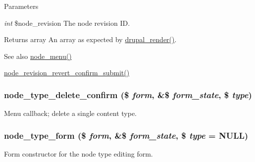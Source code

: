 \begin{DoxyParams}{Parameters}
\item[{\em int}]\$node\_\-revision The node revision ID.\end{DoxyParams}
\begin{DoxyReturn}{Returns}
array An array as expected by \hyperlink{common_8inc_a05798b44e8d6c496d4bee5cc32fa7851}{drupal\_\-render()}.
\end{DoxyReturn}
\begin{DoxySeeAlso}{See also}
\hyperlink{node_8module_a15e8d85a7559f22b8f2c77c1d5dfac63}{node\_\-menu()} 

\hyperlink{node_8pages_8inc_ae22f280976210711cb3bd363caa6d956}{node\_\-revision\_\-revert\_\-confirm\_\-submit()} 
\end{DoxySeeAlso}
\hypertarget{group__forms_ga1ecf3ba8b8cb5469096a74f3e4f18546}{
\subsubsection[{node\_\-type\_\-delete\_\-confirm}]{\setlength{\rightskip}{0pt plus 5cm}node\_\-type\_\-delete\_\-confirm (\$ {\em form}, \/  \&\$ {\em form\_\-state}, \/  \$ {\em type})}}
\label{group__forms_ga1ecf3ba8b8cb5469096a74f3e4f18546}
Menu callback; delete a single content type. \hypertarget{group__forms_ga488f2cb519f924aa0bd9579d9bb0db49}{
\subsubsection[{node\_\-type\_\-form}]{\setlength{\rightskip}{0pt plus 5cm}node\_\-type\_\-form (\$ {\em form}, \/  \&\$ {\em form\_\-state}, \/  \$ {\em type} = {\ttfamily NULL})}}
\label{group__forms_ga488f2cb519f924aa0bd9579d9bb0db49}
Form constructor for the node type editing form.


